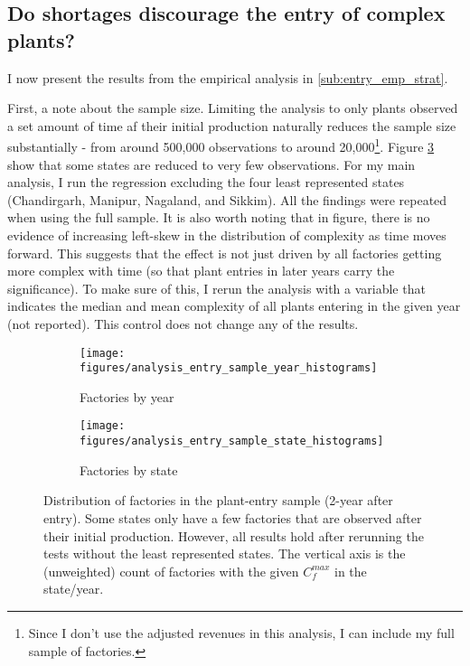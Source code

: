 \documentclass[11pt]{article}
\begin{document}
\newpage
\subsection{Do shortages discourage the entry of complex plants?}
\label{sub:longterm}
I now present the results from the empirical analysis in \ref{sub:entry_emp_strat}.

First, a note about the sample size. Limiting the analysis to only plants observed a set amount of time af their initial production naturally reduces the sample size substantially - from around 500,000 observations to around 20,000\footnote{Since I don't use the adjusted revenues in this analysis, I can include my full sample of factories.}. Figure \ref{fig:new_entry_sample} show that some states are reduced to very few observations. For my main analysis, I run the regression excluding the four least represented states (Chandirgarh, Manipur, Nagaland, and Sikkim). All the  findings were repeated when using the full sample. It is also worth noting that in figure, there is no evidence of increasing left-skew in the distribution of complexity as time moves forward. This suggests that the effect is not just driven by all factories getting more complex with time (so that plant entries in later years carry the significance). To make sure of this, I rerun the analysis with a variable that indicates the median and mean complexity of all plants entering in the given year (not reported). This control does not change any of the results.

\begin{figure}
     \centering
     \begin{subfigure}[b]{0.45\textwidth}
         \centering
         \texttt{[image: figures/analysis\_entry\_sample\_year\_histograms]}
	 \caption{Factories by year}
         \label{fig:entry_by_year}
     \end{subfigure}
     \hfill
     \begin{subfigure}[b]{0.45\textwidth}
         \centering
         \texttt{[image: figures/analysis\_entry\_sample\_state\_histograms]}
	 \caption{Factories by state}
         \label{fig:entry_by_state}
     \end{subfigure}
     \caption[Distribution of new factories by state and year]{Distribution of factories in the plant-entry sample (2-year after entry). Some states only have a few factories that are observed after their initial production. However, all results hold after rerunning the tests without the least represented states. The vertical axis is the (unweighted) count of factories with the given $C^{max}_{f}$ in the state/year.}
        \label{fig:new_entry_sample}
\end{figure}
\end{document}
